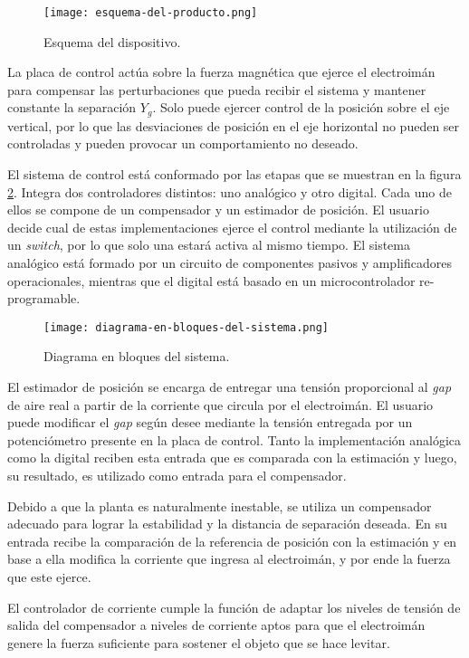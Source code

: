 \begin{figure}[H]
	\centering
	\texttt{[image: esquema-del-producto.png]}
	\caption{Esquema del dispositivo.}
	\label{fig:img_Esquema-del-producto}
\end{figure}


La placa de control actúa sobre la fuerza magnética que ejerce el electroimán para compensar las perturbaciones que pueda recibir el sistema y mantener constante la separación $Y_{g}$. Solo puede ejercer control de la posición sobre el eje vertical, por lo que las desviaciones de posición en el eje horizontal no pueden ser controladas y pueden provocar un comportamiento no deseado.

El sistema de control está conformado por las etapas que se muestran en la figura \ref{fig:img_diagrama-en-bloques-del-sistema}. Integra dos controladores distintos: uno analógico y otro digital. Cada uno de ellos se compone de un compensador y un estimador de posición.  El usuario decide cual de estas implementaciones ejerce el control mediante la utilización de un \textsl{switch}, por lo que solo una estará activa al mismo tiempo. El sistema analógico está formado por un circuito de  componentes pasivos y amplificadores operacionales, mientras que el digital está basado en un microcontrolador re-programable.

\begin{figure}[H]
	\centering
	\texttt{[image: diagrama-en-bloques-del-sistema.png]}
	\caption{Diagrama en bloques del sistema.}
	\label{fig:img_diagrama-en-bloques-del-sistema}
\end{figure}

\noindent El estimador de posición se encarga de entregar una tensión proporcional al \textsl{gap} de aire real a partir de la corriente que circula por el electroimán. El usuario puede modificar el \textsl{gap} según desee mediante la tensión entregada por un potenciómetro presente en la placa de control. Tanto la implementación analógica como la digital reciben esta entrada que es comparada con la estimación y luego, su resultado, es utilizado como entrada para el compensador.

Debido a que la planta es naturalmente inestable, se utiliza un compensador adecuado para lograr la estabilidad y la distancia de separación deseada. En su entrada recibe la comparación de la referencia de posición con la estimación y en base a ella modifica la corriente que ingresa al electroimán, y por ende la fuerza que este ejerce.

El controlador de corriente cumple la función de adaptar los niveles de tensión de salida del compensador a niveles de corriente aptos para que el electroimán genere la fuerza suficiente para sostener el objeto que se hace levitar.
 